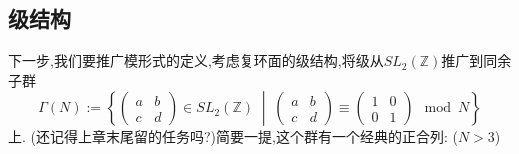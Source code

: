
\subsection{级结构}
下一步,我们要推广模形式的定义,考虑复环面的级结构,将级从$SL_2(\mathbb{Z})$推广到同余子群
$$\Gamma(N):=\left\{ \begin{pmatrix}
a &b \\ c & d
\end{pmatrix} \in SL_2(\mathbb{Z}) \;\middle|\; \begin{pmatrix}
a &b \\ c & d
\end{pmatrix} \equiv \begin{pmatrix}
1 &0 \\ 0 & 1
\end{pmatrix} \mod N  \right\}$$
上. (还记得上章末尾留的任务吗?)简要一提,这个群有一个经典的正合列: ($N>3$)
\begin{center}
\end{center}


